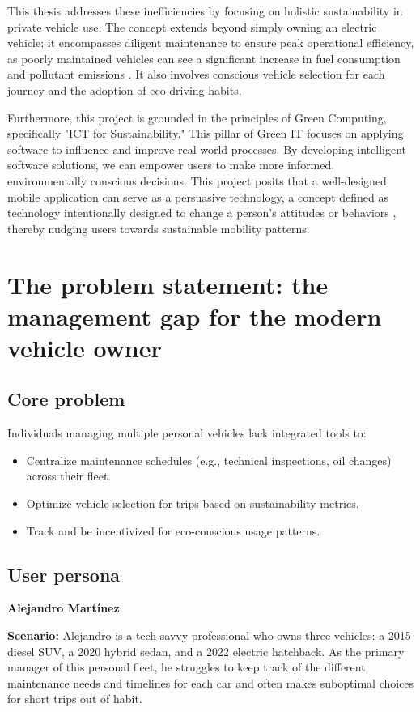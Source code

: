 \textgap

This thesis addresses these inefficiencies by focusing on holistic sustainability in private vehicle use. The concept extends beyond simply owning an electric vehicle; it encompasses diligent maintenance to ensure peak operational efficiency, as poorly maintained vehicles can see a significant increase in fuel consumption and pollutant emissions \cite{iea2021fuel}. It also involves conscious vehicle selection for each journey and the adoption of eco-driving habits.

\textgap

Furthermore, this project is grounded in the principles of Green Computing, specifically "ICT for Sustainability." This pillar of Green IT focuses on applying software to influence and improve real-world processes. By developing intelligent software solutions, we can empower users to make more informed, environmentally conscious decisions. This project posits that a well-designed mobile application can serve as a persuasive technology, a concept defined as technology intentionally designed to change a person's attitudes or behaviors \cite{fogg2002persuasive}, thereby nudging users towards sustainable mobility patterns.

\section{The problem statement: the management gap for the modern vehicle owner}

\subsection{Core problem}
Individuals managing multiple personal vehicles lack integrated tools to:
\begin{itemize}
    \item Centralize maintenance schedules (e.g., technical inspections, oil changes) across their fleet.
    \item Optimize vehicle selection for trips based on sustainability metrics.
    \item Track and be incentivized for eco-conscious usage patterns.
\end{itemize}

\subsection{User persona}
\textbf{Alejandro Martínez}
\vspace{0.7em}
\begin{flushleft}
    \textbf{Scenario:} Alejandro is a tech-savvy professional who owns three vehicles: a 2015 diesel SUV, a 2020 hybrid sedan, and a 2022 electric hatchback. As the primary manager of this personal fleet, he struggles to keep track of the different maintenance needs and timelines for each car and often makes suboptimal choices for short trips out of habit.
\end{flushleft}

